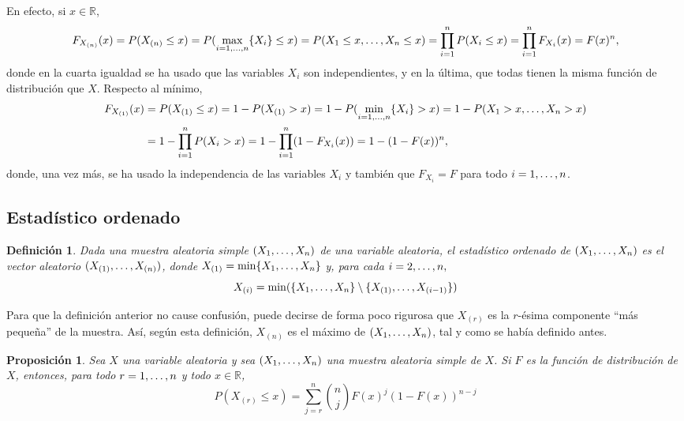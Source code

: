 \documentclass[11pt]{report}
\makeatletter
\renewenvironment{proof}[1][\proofname]{\par
  \pushQED{\qed}%
  \normalfont \topsep\z@skip %
  \trivlist
  \item[\hskip\labelsep
        \itshape
    #1\@addpunct{.}]\ignorespaces
}{%
  \popQED\endtrivlist\@endpefalse
}
\newtheorem{proposition}{Proposición}
\newtheorem{definition}{Definición}
\theoremstyle{definition}
\newcommand{\R}{\mathbb R}
\makeatother
\begin{document}
\begin{proof}
En efecto, si $x \in \R$,
\[F_{X_{(n)}}(x)=P(X_{(n)} \leq x) = P(\max_{i=1,\mathellipsis,n}\{X_i\} \leq x) = P(X_1 \leq x, \mathellipsis, X_n \leq x) = \prod_{i=1}^n P(X_i \leq x) = \prod_{i=1}^n F_{X_i}(x) = F(x)^n,\]
donde en la cuarta igualdad se ha usado que las variables $X_i$ son independientes, y en la última, que todas tienen la misma función de distribución que $X$. Respecto al mínimo,
\[
\begin{aligned}[t]
F_{X_{(1)}}(x) &= P(X_{(1)} \leq x) = 1-P(X_{(1)} > x) = 1-P(\min_{i=1,\mathellipsis,n}\{X_i\} > x) = 1-P(X_1>x,\mathellipsis,X_n>x) \\
&= 1-\prod_{i=1}^n P(X_i>x) = 1-\prod_{i=1}^n(1-F_{X_i}(x)) = 1-(1-F(x))^n,
\end{aligned}\]
donde, una vez más, se ha usado la independencia de las variables $X_i$ y también que $F_{X_i} = F$ para todo $i =1,\mathellipsis,n$.
\end{proof}

\subsection{Estadístico ordenado}

\begin{definition}
Dada una muestra aleatoria simple $(X_1,\mathellipsis,X_n)$ de una variable aleatoria, el \emph{estadístico ordenado de $(X_1,\mathellipsis,X_n)$} es el vector aleatorio $(X_{(1)},\mathellipsis,X_{(n)})$, donde $X_{(1)} = \min\{X_1,\mathellipsis,X_n\}$ y, para cada $i =2,\mathellipsis,n,$
\[X_{(i)} = \min(\{X_1,\mathellipsis,X_n\} \setminus \{X_{(1)},\mathellipsis,X_{(i-1)}\})\]
\end{definition}

Para que la definición anterior no cause confusión, puede decirse de forma poco rigurosa que $X_{(r)}$ es la $r$-ésima componente \enquote{más pequeña} de la muestra. Así, según esta definición, $X_{(n)}$ es el máximo de $(X_1,\mathellipsis,X_n)$, tal y como se había definido antes.

\begin{proposition}
Sea $X$ una variable aleatoria y sea $(X_1,\mathellipsis,X_n)$ una muestra aleatoria simple de $X$. Si $F$ es la función de distribución de $X$, entonces, para todo $r = 1,\mathellipsis,n$ y todo $x \in \R$,
\[P({X_{(r)}} \leq x) = \sum_{j=r}^n \binom{n}{j} F(x)^j(1-F(x))^{n-j}\]
\end{proposition}
\end{document}
